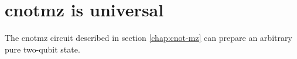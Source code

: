 \chapter{\gls{cnotmz} is universal}
\label{app:prove-two-qubits}

The \gls{cnotmz} circuit described in section \ref{chap:cnot-mz} can prepare an arbitrary pure two-qubit state. 






